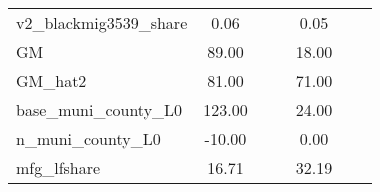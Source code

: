 \begin{table}[htbp]
\begin{tabular}{l*{2}{ccc}}
v2\_blackmig3539\_share&        0.06&            &            &        0.05&            &            \\
GM                  &       89.00&            &            &       18.00&            &            \\
GM\_hat2             &       81.00&            &            &       71.00&            &            \\
base\_muni\_county\_L0 &      123.00&            &            &       24.00&            &            \\
n\_muni\_county\_L0    &      -10.00&            &            &        0.00&            &            \\
mfg\_lfshare         &       16.71&            &            &       32.19&            &            \\
\bottomrule
\end{tabular}
\end{table}
